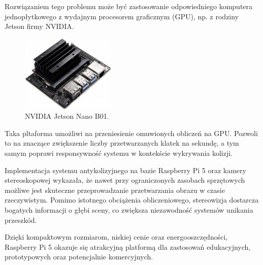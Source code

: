 \documentclass[magisterska]{pracadypl}
\begin{document}
Rozwiązaniem tego problemu może być zastosowanie odpowiedniego komputera jednopłytkowego z wydajnym procesorem graficznym (GPU), np. z rodziny Jetson firmy NVIDIA.

\begin{figure}[H]  %
    \centering  %
    \includegraphics[width=0.4\textwidth]{images/jetson.png}  %
    \captionsetup{font=footnotesize}
    \caption[NVIDIA Jetson Nano B01. https://kamami.pl/wycofane-z-oferty/574587-zestaw-deweloperski-nvidia-jetson-nano.html]{NVIDIA Jetson Nano B01.}
\end{figure}

Taka pltaforma umożliwi na przeniesienie omuwionych obliczeń na GPU. Pozwoli to na znaczące zwiększenie liczby przetwarzanych klatek na sekundę, a tym samym poprawi responsywność systemu w kontekście wykrywania kolizji.

Implementacja systemu antykolizyjnego na bazie Raspberry Pi 5 oraz kamery stereoskopowej wykazała, że nawet przy ograniczonych zasobach sprzętowych możliwe jest skuteczne przeprowadzanie przetwarzania obrazu w czasie rzeczywistym. Pomimo istotnego obciążenia obliczeniowego, stereowizja dostarcza bogatych informacji o głębi sceny, co zwiększa niezawodność systemów unikania przeszkód.

Dzięki kompaktowym rozmiarom, niskiej cenie oraz energooszczędności, Raspberry Pi 5 okazuje się atrakcyjną platformą dla zastosowań edukacyjnych, prototypowych oraz potencjalnie komercyjnych.

\renewcommand{\listfigurename}{Spis rysunków}
\listoffigures
\end{document}
